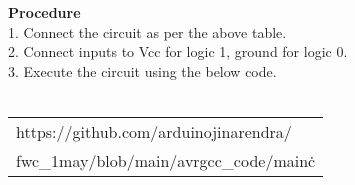\documentclass[journal,12pt,twocolumn]{IEEEtran}
\begin{document}
\textbf{Procedure}\\
1. Connect the circuit as per the above table.\\
2. Connect inputs to Vcc for logic 1, ground for logic 0.\\
3. Execute the circuit using the below code.\\
\\\begin{tabularx}{0.45\textwidth} { 
  | >{\centering\arraybackslash}X |
 }
  \hline
https://github.com/arduinojinarendra/\\fwc\_1may/blob/main/avr\-gcc\_code/main\.c\\
  \hline
\end{tabularx}




\end{document}

